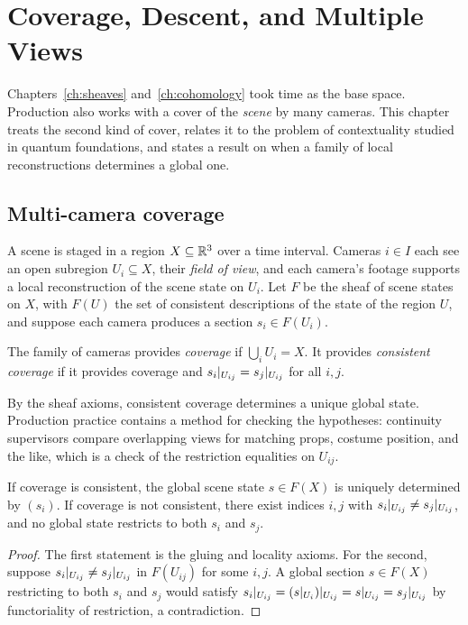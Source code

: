\chapter{Coverage, Descent, and Multiple Views}
\label{ch:descent}

Chapters~\ref{ch:sheaves} and~\ref{ch:cohomology} took time as the base space. Production also works with a cover of the \emph{scene} by many cameras. This chapter treats the second kind of cover, relates it to the problem of contextuality studied in quantum foundations, and states a result on when a family of local reconstructions determines a global one.

\section{Multi-camera coverage}

A scene is staged in a region $X\subseteq\mathbb{R}^3$ over a time interval. Cameras $i\in I$ each see an open subregion $U_i\subseteq X$, their \emph{field of view}, and each camera's footage supports a local reconstruction of the scene state on $U_i$. Let $F$ be the sheaf of scene states on $X$, with $F(U)$ the set of consistent descriptions of the state of the region $U$, and suppose each camera produces a section $s_i\in F(U_i)$.

\begin{definition}[Coverage]
The family of cameras provides \emph{coverage} if $\bigcup_iU_i=X$. It provides \emph{consistent coverage} if it provides coverage and $s_i|_{U_{ij}}=s_j|_{U_{ij}}$ for all $i,j$.
\end{definition}

By the sheaf axioms, consistent coverage determines a unique global state. Production practice contains a method for checking the hypotheses: continuity supervisors compare overlapping views for matching props, costume position, and the like, which is a check of the restriction equalities on $U_{ij}$.

\begin{proposition}\label{prop:cover}
If coverage is consistent, the global scene state $s\in F(X)$ is uniquely determined by $(s_i)$. If coverage is not consistent, there exist indices $i,j$ with $s_i|_{U_{ij}}\ne s_j|_{U_{ij}}$, and no global state restricts to both $s_i$ and $s_j$.
\end{proposition}

\begin{proof}
The first statement is the gluing and locality axioms. For the second, suppose $s_i|_{U_{ij}}\ne s_j|_{U_{ij}}$ in $F(U_{ij})$ for some $i,j$. A global section $s\in F(X)$ restricting to both $s_i$ and $s_j$ would satisfy $s_i|_{U_{ij}}=(s|_{U_i})|_{U_{ij}}=s|_{U_{ij}}=s_j|_{U_{ij}}$ by functoriality of restriction, a contradiction.
\end{proof}

